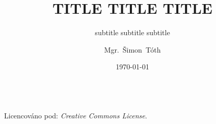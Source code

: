 

\title{TITLE TITLE TITLE}
\subtitle{subtitle subtitle subtitle}
\author[]{Mgr.~Šimon~Tóth}
\date{\today}

\newcommand{\CcNote}[1]{%
        Licencováno pod: \textit{Creative Commons #1 3.0 License}.%
}


	\begin{frame}
		\titlepage
		\vfill
		\begin{center}
			\\
			{\tiny\CcNote{\CcLongnameByNcSa}}
			\vspace*{2ex}
		\end{center}
	\end{frame}

\begin{frame}
	\frametitle{}
\end{frame}





